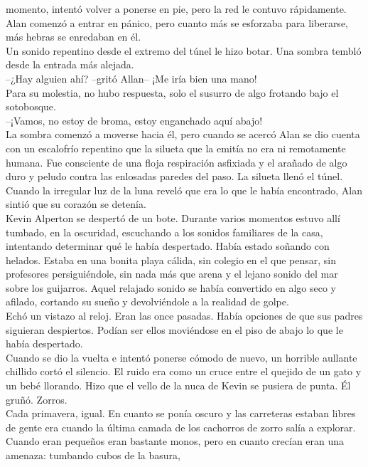 momento, intentó volver a ponerse en pie, pero la red le contuvo
rápidamente. Alan comenzó a entrar en pánico, pero cuanto más se
esforzaba para liberarse, más hebras se enredaban en él.\\
Un sonido repentino desde el extremo del túnel le hizo botar. Una sombra
tembló desde la entrada más alejada.\\
--¿Hay alguien ahí? --gritó Allan-- ¡Me iría bien una mano!\\
Para su molestia, no hubo respuesta, solo el susurro de algo frotando
bajo el sotobosque.\\
--¡Vamos, no estoy de broma, estoy enganchado aquí abajo!\\
La sombra comenzó a moverse hacia él, pero cuando se acercó Alan se dio
cuenta con un escalofrío repentino que la silueta que la emitía no era
ni remotamente humana. Fue consciente de una floja respiración asfixiada
y el arañado de algo duro y peludo contra las enlosadas paredes del
paso. La silueta llenó el túnel.\\
Cuando la irregular luz de la luna reveló que era lo que le había
encontrado, Alan sintió que su corazón se
detenía.\\[2\baselineskip]Kevin Alperton se despertó de un bote. Durante
varios momentos estuvo allí tumbado, en la oscuridad, escuchando a los
sonidos familiares de la casa, intentando determinar qué le había
despertado. Había estado soñando con helados. Estaba en una bonita playa
cálida, sin colegio en el que pensar, sin profesores persiguiéndole, sin
nada más que arena y el lejano sonido del mar sobre los guijarros. Aquel
relajado sonido se había convertido en algo seco y afilado, cortando su
sueño y devolviéndole a la realidad de golpe.\\
Echó un vistazo al reloj. Eran las once pasadas. Había opciones de que
sus padres siguieran despiertos. Podían ser ellos moviéndose en el piso
de abajo lo que le había despertado.\\
Cuando se dio la vuelta e intentó ponerse cómodo de nuevo, un horrible
aullante chillido cortó el silencio. El ruido era como un cruce entre el
quejido de un gato y un bebé llorando. Hizo que el vello de la nuca de
Kevin se pusiera de punta. Él gruñó. Zorros.\\
Cada primavera, igual. En cuanto se ponía oscuro y las carreteras
estaban libres de gente era cuando la última camada de los cachorros de
zorro salía a explorar. Cuando eran pequeños eran bastante monos, pero
en cuanto crecían eran una amenaza: tumbando cubos de la basura,

